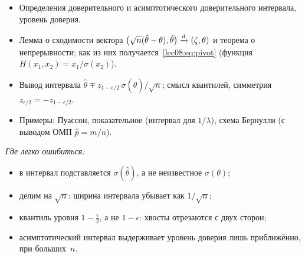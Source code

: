 \begin{keybox}
  \begin{itemize}
    \item Определения доверительного и асимптотического доверительного интервала,
          уровень доверия.
    \item Лемма о сходимости вектора $\bigl(\sqrt{n}(\hat\theta - \theta), \hat\theta\bigr) \xrightarrow{d} (\zeta, \theta)$
          и теорема о непрерывности; как из них получается~\eqref{lec08:eq:pivot}
          (функция $H(x_1, x_2) = x_1 / \sigma(x_2)$).
    \item Вывод интервала $\hat\theta \mp z_{1-\epsilon/2}\, \sigma(\hat\theta) / \sqrt n$;
          смысл квантилей, симметрия $z_{\epsilon/2} = -z_{1-\epsilon/2}$.
    \item Примеры: Пуассон, показательное (интервал для $1/\lambda$), схема Бернулли
          (с выводом ОМП $\hat p = m/n$).
  \end{itemize}
  \emph{Где легко ошибиться:}
  \begin{itemize}
    \item в интервал подставляется $\sigma(\hat\theta)$, а не неизвестное $\sigma(\theta)$;
    \item делим на $\sqrt n$: ширина интервала убывает как $1/\sqrt n$;
    \item квантиль уровня $1 - \frac\epsilon2$, а не $1 - \epsilon$: хвосты отрезаются с двух сторон;
    \item асимптотический интервал выдерживает уровень доверия лишь приближённо, при больших~$n$.
  \end{itemize}
\end{keybox}
